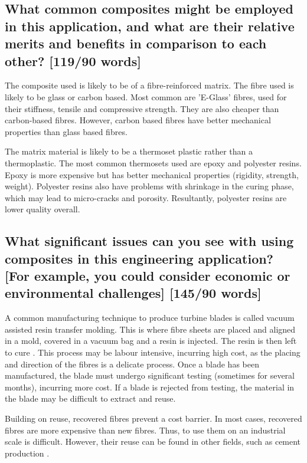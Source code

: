 \documentclass[12pt]{article}
\numberwithin{equation}{section}
\begin{document}
\begin{flushleft}
\subsection[Common composites and their relative advantages.]{What common composites might be employed in this application, and what are their relative merits and benefits in comparison to each other? [119/90 words]}
The composite used is likely to be of a fibre-reinforced matrix. The fibre used is likely to be glass or carbon based. Most common are 'E-Glass' fibres, used for their stiffness, tensile and compressive strength. They are also cheaper than carbon-based fibres. However, carbon based fibres have better mechanical properties than glass based fibres. 

The matrix material is likely to be a thermoset plastic rather than a thermoplastic. The most common thermosets used are epoxy and polyester resins. Epoxy is more expensive but has better mechanical properties (rigidity, strength, weight). Polyester resins also have problems with shrinkage in the curing phase, which may lead to micro-cracks and porosity. Resultantly, polyester resins are lower quality overall.

\subsection[Issues with composites.]{What significant issues can you see with using composites in this engineering application? [For 
example, you could consider economic or environmental
challenges] [145/90 words]}
A common manufacturing technique to produce turbine blades is called vacuum assisted resin transfer molding. This is where fibre sheets are placed and aligned in a mold, covered in a vacuum bag and a resin is injected. The resin is then left to cure \citep{VARTM}. This process may be labour intensive, incurring high cost, as the placing and direction of the fibres is a delicate process. Once a blade has been manufactured, the blade must undergo significant testing (sometimes for several months), incurring more cost. If a blade is rejected from testing, the material in the blade may be difficult to extract and reuse. 

Building on reuse, recovered fibres prevent a cost barrier. In most cases, recovered fibres are more expensive than new fibres. Thus, to use them on an industrial scale is difficult. However, their reuse can be found in other fields, such as cement production \citep{fiberCement}.


\end{flushleft}
\end{document}
